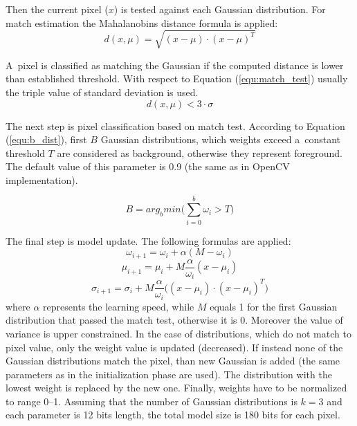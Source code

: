 \documentclass[b5paper,10pt,twoside]{article}
\begin{document}
{Then the current pixel ($x$) is tested against each Gaussian distribution. 
For match estimation the Mahalanobins distance formula is applied:
\begin{equation}
\label{equ:mah_dist}
d(x, \mu) = \sqrt{(x-\mu)\cdot(x-\mu)^T}
\end{equation}




A~pixel is classified as matching the Gaussian if the computed distance is lower than established threshold. 
With respect to Equation (\ref{equ:match_test}) usually the triple value of standard deviation is used.
\begin{equation}
\label{equ:match_test}
d(x, \mu) < 3 \cdot \sigma
\end{equation}


The next step is pixel classification based on match test. 
According to Equation (\ref{equ:b_dist}), first $B$ Gaussian distributions, which weights exceed a~constant threshold $T$ are considered as background, otherwise they represent foreground. The default value of this parameter is 0.9 (the same as in OpenCV implementation).


\begin{equation}
\label{equ:b_dist}
B = arg_b min \Bigg( \sum_{i=0}^{b}\omega_i>T \Bigg)
\end{equation}



The final step is model update. 
The following formulas are applied:
\begin{equation}
\label{equ:w_update}
\omega_{i+1} = \omega_{i} + \alpha(M-\omega_i)
\end{equation}
\begin{equation}
\label{equ:u_update}
\mu_{i+1} = \mu_{i} + M\frac{\alpha}{\omega_i} (x-\mu_i)
\end{equation}
\begin{equation}
\label{equ:s_update}
\sigma_{i+1} = \sigma_{i} + M\frac{\alpha}{\omega_i}\Big( (x-\mu_i) \cdot (x-\mu_i)^T \Big)
\end{equation}
\noindent where $\alpha$ represents the learning speed, while $M$ equals 1 for the first Gaussian distribution that passed the match test, otherwise it is 0. 
Moreover the value of variance is upper constrained. 
In the case of distributions, which do not match to pixel value, only the weight value is updated (decreased). 
If instead none of the Gaussian distributions match the pixel, than new Gaussian is added (the same parameters as in the initialization phase are used). 
The distribution with the lowest weight is replaced by the new one. 
Finally, weights have to be normalized to range 0--1. 
Assuming that the number of Gaussian distributions is $k=3$ and each parameter is 12 bits length, the total model size is 180 bits for each pixel.


}
\end{document}
